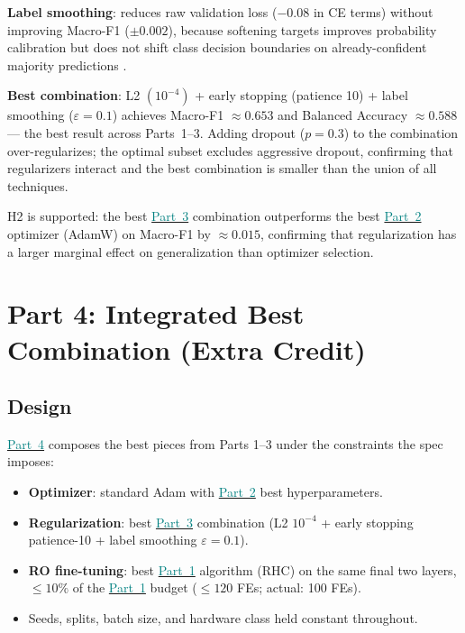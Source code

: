 \documentclass[conference]{IEEEtran}
\newcommand{\partref}[2]{\hyperref[#2]{\textcolor{teal}{Part~#1}}}
\begin{document}
\textbf{Label smoothing}: reduces raw validation loss ($-0.08$ in CE terms)
without improving Macro-F1 ($\pm 0.002$), because softening targets
improves probability calibration but does not shift class decision boundaries
on already-confident majority predictions \cite{muller2019labelsmoothing}.

\textbf{Best combination}: L2 $(10^{-4})$ + early stopping (patience 10) +
label smoothing ($\varepsilon{=}0.1$) achieves Macro-F1 ${\approx}0.653$
and Balanced Accuracy ${\approx}0.588$ --- the best result across Parts~1--3.
Adding dropout ($p{=}0.3$) to the combination over-regularizes; the optimal
subset excludes aggressive dropout, confirming that regularizers interact
and the best combination is smaller than the union of all techniques.

H2 is supported: the best \partref{3}{sec:p3} combination outperforms the best \partref{2}{sec:p2}
optimizer (AdamW) on Macro-F1 by ${\approx}0.015$, confirming that
regularization has a larger marginal effect on generalization than
optimizer selection.

\section{Part 4: Integrated Best Combination (Extra Credit)}\label{sec:p4}

\subsection{Design}\label{sec:p4:design}
\partref{4}{sec:p4} composes the best pieces from Parts 1--3 under the constraints
the spec imposes:
\begin{itemize}[leftmargin=*]
\item \textbf{Optimizer}: standard Adam with \partref{2}{sec:p2} best hyperparameters.
\item \textbf{Regularization}: best \partref{3}{sec:p3} combination
(L2 $10^{-4}$ + early stopping patience-10 + label smoothing $\varepsilon{=}0.1$).
\item \textbf{RO fine-tuning}: best \partref{1}{sec:p1} algorithm (RHC) on the same
final two layers, $\leq10\%$ of the \partref{1}{sec:p1} budget
($\leq120$ FEs; actual: 100 FEs).
\item Seeds, splits, batch size, and hardware class held constant throughout.
\end{itemize}
\end{document}
